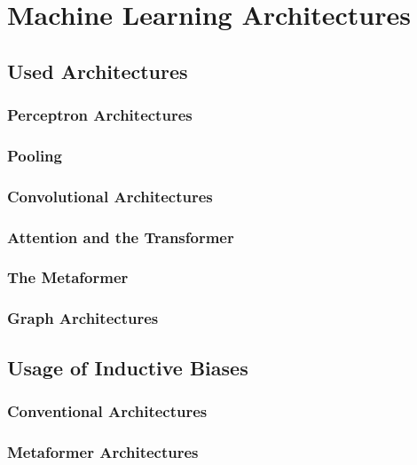 \documentclass[
headings=optiontohead,              %
12pt,                               %
DIV=13,                             %
twoside=false,                      %
open=right,                         %
BCOR=10mm,                          %
toc=bibliographynumbered            %
]{scrreport}
\begin{document}
\chapter{Machine Learning Architectures}
\label{sec:architectures}

    \section{Used Architectures}
        \subsection{Perceptron Architectures}
        \label{sec:architectures-perceptron}
        \subsection{Pooling}
        \label{sec:architectures-pooling}
        \subsection{Convolutional Architectures}
        \label{sec:architectures-convolution}
        \subsection{Attention and the Transformer}
        \label{sec:architectures-attention}
        \subsection{The Metaformer}
        \label{sec:architectures-metaformer}
        \subsection{Graph Architectures}
        \label{sec:architectures-graphs}
    \section{Usage of Inductive Biases}
        \subsection{Conventional Architectures}
        \label{sec:architectures-biasesnormal}
        \subsection{Metaformer Architectures}
        \label{sec:architectures-biasesmetaformer}
\end{document}

